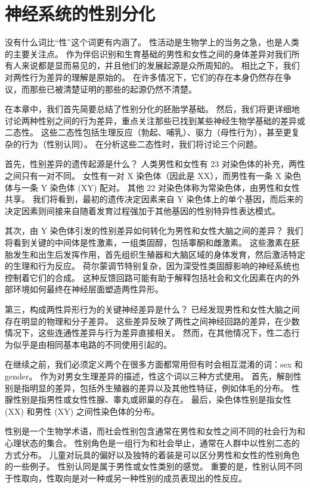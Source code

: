 \chapter{神经系统的性别分化} \label{chap:chap51}
没有什么词比“性”这个词更有内涵了。 性活动是生物学上的当务之急，也是人类的主要关注点。 作为伴侣识别和生育基础的男性和女性之间的身体差异对我们所有人来说都是显而易见的，并且他们的发展起源是众所周知的。 相比之下，我们对两性行为差异的理解是原始的。 在许多情况下，它们的存在本身仍然存在争议，而那些已被清楚证明的那些的起源仍然不清楚。

在本章中，我们首先简要总结了性别分化的胚胎学基础。 然后，我们将更详细地讨论两种性别之间的行为差异，重点关注那些已找到某些神经生物学基础的差异或二态性。 这些二态性包括生理反应（勃起、哺乳）、驱力（母性行为），甚至更复杂的行为（性别认同）。 在分析这些二态性时，我们将讨论三个问题。

首先，性别差异的遗传起源是什么？ 人类男性和女性有 23 对染色体的补充，两性之间只有一对不同。 女性有一对 X 染色体（因此是 XX），而男性有一条 X 染色体与一条 Y 染色体 (XY) 配对。 其他 22 对染色体称为常染色体，由男性和女性共享。 我们将看到，最初的遗传决定因素来自 Y 染色体上的单个基因，而后来的决定因素则间接来自随着发育过程强加于其他基因的性别特异性表达模式。

其次，由 Y 染色体引发的性别差异如何转化为男性和女性大脑之间的差异？ 我们将看到关键的中间体是性激素，一组类固醇，包括睾酮和雌激素。 这些激素在胚胎发生和出生后发挥作用，首先组织生殖器和大脑区域的身体发育，然后激活特定的生理和行为反应。 荷尔蒙调节特别复杂，因为深受性类固醇影响的神经系统也控制着它们的合成。 这种反馈回路可能有助于解释包括社会和文化因素在内的外部环境如何最终在神经层面塑造两性异形。

第三，构成两性异形行为的关键神经差异是什么？ 已经发现男性和女性大脑之间存在明显的物理和分子差异。 这些差异反映了两性之间神经回路的差异，在少数情况下，这些连通性差异与行为差异直接相关。 然而，在其他情况下，性二态行为似乎是由相同基本电路的不同使用引起的。

在继续之前，我们必须定义两个在很多方面都常用但有时会相互混淆的词：sex 和 gender。 作为对男女生理差异的描述，性这个词以三种方式使用。 首先，解剖性别是指明显的差异，包括外生殖器的差异以及其他性特征，例如体毛的分布。 性腺性别是指男性或女性性腺、睾丸或卵巢的存在。 最后，染色体性别是指女性 (XX) 和男性 (XY) 之间性染色体的分布。

性别是一个生物学术语，而社会性别包含通常在男性和女性之间不同的社会行为和心理状态的集合。 性别角色是一组行为和社会举止，通常在人群中以性别二态的方式分布。 儿童对玩具的偏好以及独特的着装是可以区分男性和女性的性别角色的一些例子。 性别认同是属于男性或女性类别的感觉。 重要的是，性别认同不同于性取向，性取向是对一种或另一种性别的成员表现出的性反应。

